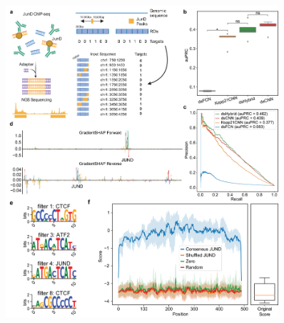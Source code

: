 \begin{figure}[p]
    \centering
    \includegraphics[width=0.9\textwidth, height=0.745\textheight]{1_figures-and-files/extended_data_figure2.png}

\end{figure}
